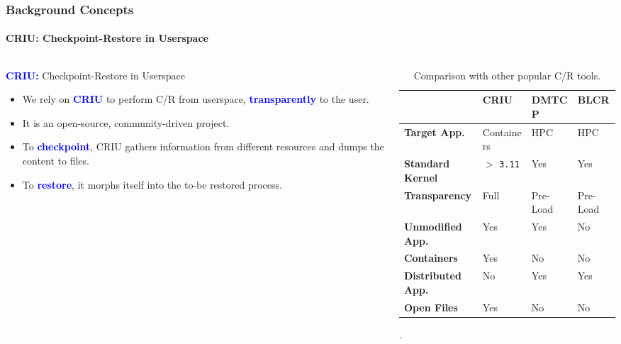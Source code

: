 \documentclass[9pt,    %
    english,            %
    xcolor=table,       %
    envcountsect,        %
    aspectratio=169     %
]{beamer}
\begin{document}
\begin{frame}
    \frametitle{Background Concepts}
    \framesubtitle{\textsc{CRIU}: Checkpoint-Restore in Userspace}

    \begin{columns}[t]
        \begin{column}{.5\textwidth}
            \textbf{\textcolor{blue}{CRIU:}} Checkpoint-Restore in Userspace 
            \begin{itemize}
                \item We rely on \textbf{\textcolor{blue}{CRIU}} to perform C/R from userspace, \textbf{\textcolor{blue}{transparently}} to the user.
                \item It is an open-source, community-driven project.
                \item To \textbf{\textcolor{blue}{checkpoint}}, CRIU gathers information from different resources and dumps the content to files.
                \item To \textbf{\textcolor{blue}{restore}}, it morphs itself into the to-be restored process.
            \end{itemize}
        \end{column}
        \begin{column}{.50\textwidth}
            \begin{table}
                \centering
                {\scriptsize
                \begin{tabular}{p{1.7cm}p{1.1cm}p{1.1cm}p{1.1cm}}
                    \rowcolor{blue!50} \hline & \textbf{CRIU} & \textbf{DMTCP} & \textbf{BLCR} \\[3pt]
                    \hline \hline \textbf{Target App.} & Containers & HPC & HPC \\[3pt]
                    \textbf{Standard Kernel} & $>$ \texttt{3.11} & Yes & Yes \\[3pt]
                    \textbf{Transparency} &  Full & Pre-Load & Pre-Load \\[3pt]
                    \textbf{Unmodified App.} & Yes & Yes & No \\[3pt]
                    \textbf{Containers} & Yes & No & No \\[3pt]
                    \textbf{Distributed App.} & No & Yes & Yes \\[3pt]
                    \textbf{Open Files} & Yes & No & No \\[3pt] \hline
                \end{tabular}
                }
                \caption{Comparison with other popular C/R tools.\label{table:filter}}.
            \end{table}
        \end{column}
    \end{columns}
\end{frame}
\end{document}
